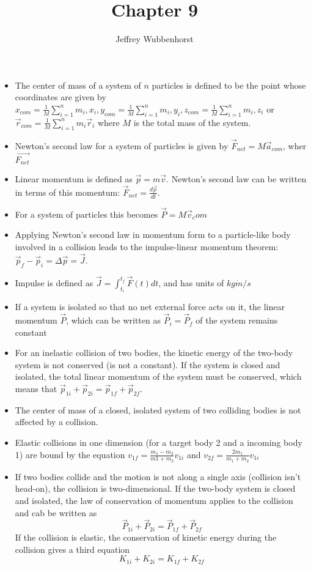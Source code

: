\documentclass[10pt,letterpaper]{article}
\author{Jeffrey Wubbenhorst}
\title{Chapter 9}
\begin{document}
\maketitle


\begin{itemize}

\item The center of mass of a system of $n$ particles is defined to be the point whose coordinates are given by $x_{com}=\frac{1}{M}\sum^n_{i=1}m_i,x_i,y_{com}=\frac{1}{M}\sum^n_{i=1}m_i,y_i,z_{com}=\frac{1}{M}\sum^n_{i=1}m_i,z_i$ or $\vec{r}_{com}=\frac{1}{M}\sum^n_{i=1}m_i\vec{r}_i$ where $M$ is the total mass of the system. 

\item Newton's second law for a system of particles is given by $\vec{F}_{net}=M\vec{a}_{com}$, wher $\vec{F_{net}}$%

\item Linear momentum is defined as $\vec{p}=m\vec{v}$. Newton's second law can be written in terms of this momentum: $\vec{F}_{net}=\frac{d\vec{p}}{dt}$. 
\item For a system of particles this becomes $\vec{P}=M\vec{v}_com$ 
\item Applying Newton's second law in momentum form to a particle-like body involved in a collision leads to the impulse-linear momentum theorem: $\vec{p}_f-\vec{p}_i=\Delta\vec{p}=\vec{J}$. 
\item Impulse is defined as $\vec{J}=\int_{t_i}^{t_f}\vec{F}(t)dt$, and has units of $kg\dot m/s$
\item If a system is isolated so that no net external force acts on it, the linear momentum $\vec{P}$, which can be written as $\vec{P}_i=\vec{P}_f$ of the system remains constant 
\item For an inelastic collision of two bodies, the kinetic energy of the two-body system is not conserved (is not a constant). If the system is closed and isolated, the total linear momentum of the system must be conserved, which means that $\vec{p}_{1i}+\vec{p}_{2i}=\vec{p}_{1f}+\vec{p}_{2f}$. 
\item The center of mass of a closed, isolated system of two colliding bodies is not affected by a collision. %
\item Elastic collisions in one dimension (for a target body 2 and a incoming body 1) are bound by the equation $v_{1f}=\frac{m_1-m_2}{m1+m_2}v_{1i}$ and $v_{2f}=\frac{2m_1}{m_1+m_2}v_{1i}$
\item If two bodies collide and the motion is not along a single axis (collision isn't head-on), the collision is two-dimensional. If the two-body system is closed and isolated, the law of conservation of momentum applies to the collision and cab be written as $$\vec{P}_{1i}+\vec{P}_{2i}=\vec{P}_{1f}+\vec{P}_{2f}$$ 
If the collision is elastic, the conservation of kinetic energy during the collision gives a third equation $$K_{1i}+K_{2i}=K_{1f}+K_{2f}$$ 

\end{itemize}
\end{document}
